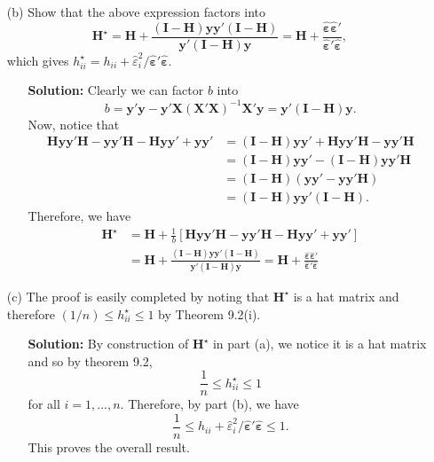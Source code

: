 \documentclass[11pt]{article}
\begin{document}
\begin{itemize}
\item[(b)] Show that the above expression factors into
\[
\mathbf{H}^\star = \mathbf{H} + \frac{(\mathbf{I}-\mathbf{H})\mathbf{y}\mathbf{y}'(\mathbf{I} - \mathbf{H})}{\mathbf{y}'(\mathbf{I} - \mathbf{H})\mathbf{y}} = \mathbf{H} + \frac{\widehat{\bm\varepsilon}\widehat{\bm\varepsilon}'}{\widehat{\bm\varepsilon}'\widehat{\bm\varepsilon}},
\]
which gives $h_{ii}^\star = h_{ii} + \widehat{\varepsilon}_i^2 / \widehat{\bm\varepsilon}'\widehat{\bm\varepsilon}$.
\begin{itemize}
\item[] \textbf{Solution:}  Clearly we can factor $b$ into
\[
b = \mathbf{y}'\mathbf{y} - \mathbf{y}'\mathbf{X}(\mathbf{X}'\mathbf{X})^{-1}\mathbf{X}'\mathbf{y} = \mathbf{y}'(\mathbf{I}-\mathbf{H})\mathbf{y}.
\]
Now, notice that
\begin{align*}
\mathbf{H}\mathbf{y}\mathbf{y}'\mathbf{H} - \mathbf{y}\mathbf{y}'\mathbf{H} - \mathbf{H}\mathbf{y}\mathbf{y}' + \mathbf{y}\mathbf{y}' &= (\mathbf{I}-\mathbf{H})\mathbf{y}\mathbf{y}' + \mathbf{H}\mathbf{y}\mathbf{y}'\mathbf{H} - \mathbf{y}\mathbf{y}'\mathbf{H} \\
&= (\mathbf{I}-\mathbf{H})\mathbf{y}\mathbf{y}' - (\mathbf{I}-\mathbf{H})\mathbf{y}\mathbf{y}'\mathbf{H} \\
&= (\mathbf{I}-\mathbf{H})(\mathbf{y}\mathbf{y}' - \mathbf{y}\mathbf{y}'\mathbf{H}) \\
&=(\mathbf{I}-\mathbf{H})\mathbf{y}\mathbf{y}'(\mathbf{I}-\mathbf{H}).
\end{align*}
Therefore, we have
\begin{align*}
\mathbf{H}^\star &=  \mathbf{H} + \frac{1}{b}\left[\mathbf{H}\mathbf{y}\mathbf{y}'\mathbf{H} - \mathbf{y}\mathbf{y}'\mathbf{H} - \mathbf{H}\mathbf{y}\mathbf{y}' + \mathbf{y}\mathbf{y}'\right] \\
&= \mathbf{H} + \frac{(\mathbf{I}-\mathbf{H})\mathbf{y}\mathbf{y}'(\mathbf{I} - \mathbf{H})}{\mathbf{y}'(\mathbf{I} - \mathbf{H})\mathbf{y}} = \mathbf{H} + \frac{\widehat{\bm\varepsilon}\widehat{\bm\varepsilon}'}{\widehat{\bm\varepsilon}'\widehat{\bm\varepsilon}}
\end{align*}
\end{itemize}

\item[(c)] The proof is easily completed by noting that $\mathbf{H}^\star$ is a hat matrix and therefore $(1/n) \leq h_{ii}^\star \leq 1$ by Theorem 9.2(i).
\begin{itemize}
\item[] \textbf{Solution:}  By construction of $\mathbf{H}^\star$ in part (a), we notice it is a hat matrix and so by theorem 9.2,
\[
\frac{1}{n}\leq h_{ii}^\star \leq 1
\]
for all $i=1,...,n$.  Therefore, by part (b), we have
\[
\frac{1}{n} \leq h_{ii} + \widehat{\varepsilon}_i^2 / \widehat{\bm\varepsilon}'\widehat{\bm\varepsilon} \leq 1.
\]
This proves the overall result.
\end{itemize}
\end{itemize}
\end{document}
